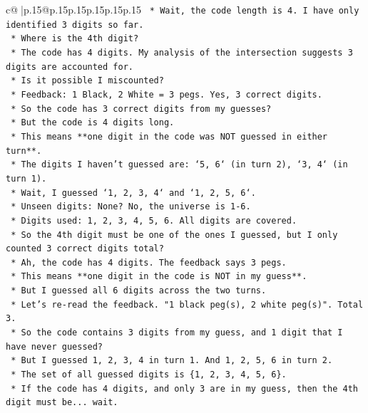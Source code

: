 \documentclass{article}
\begin{document}
{\begin{supertabular}{c@{$\;$}|p{.15\linewidth}@{}p{.15\linewidth}p{.15\linewidth}p{.15\linewidth}p{.15\linewidth}p{.15\linewidth}}
{{{\texttt{        *   Wait, the code length is 4. I have only identified 3 digits so far.} \\
\texttt{        *   Where is the 4th digit?} \\
\texttt{        *   The code has 4 digits. My analysis of the intersection suggests 3 digits are accounted for.} \\
\texttt{        *   Is it possible I miscounted?} \\
\texttt{        *   Feedback: 1 Black, 2 White = 3 pegs. Yes, 3 correct digits.} \\
\texttt{        *   So the code has 3 correct digits from my guesses?} \\
\texttt{        *   But the code is 4 digits long.} \\
\texttt{        *   This means **one digit in the code was NOT guessed in either turn**.} \\
\texttt{        *   The digits I haven't guessed are: `5, 6` (in turn 2), `3, 4` (in turn 1).} \\
\texttt{        *   Wait, I guessed `1, 2, 3, 4` and `1, 2, 5, 6`.} \\
\texttt{        *   Unseen digits: None? No, the universe is 1{-}6.} \\
\texttt{        *   Digits used: 1, 2, 3, 4, 5, 6. All digits are covered.} \\
\texttt{        *   So the 4th digit must be one of the ones I guessed, but I only counted 3 correct digits total?} \\
\texttt{        *   Ah, the code has 4 digits. The feedback says 3 pegs.} \\
\texttt{        *   This means **one digit in the code is NOT in my guess**.} \\
\texttt{        *   But I guessed all 6 digits across the two turns.} \\
\texttt{        *   Let's re{-}read the feedback. "1 black peg(s), 2 white peg(s)". Total 3.} \\
\texttt{        *   So the code contains 3 digits from my guess, and 1 digit that I have never guessed?} \\
\texttt{        *   But I guessed 1, 2, 3, 4 in turn 1. And 1, 2, 5, 6 in turn 2.} \\
\texttt{        *   The set of all guessed digits is \{1, 2, 3, 4, 5, 6\}.} \\
\texttt{        *   If the code has 4 digits, and only 3 are in my guess, then the 4th digit must be... wait.} \\
}}}
\end{supertabular}}
\end{document}
